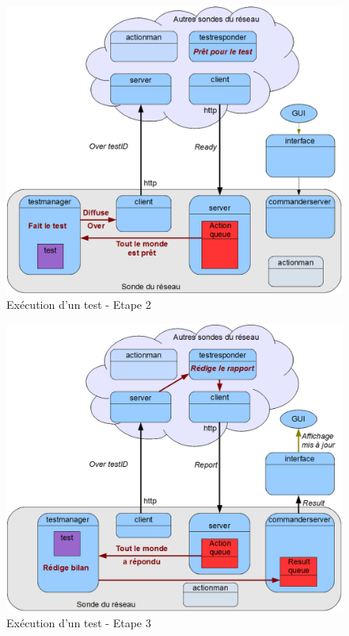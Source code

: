 \documentclass[a4paper,11pt]{article}
\begin{document}
\begin{figure}
\centering\includegraphics[width=\linewidth]{img/graphTest2.png}
\caption{Exécution d'un test - Etape 2}
\end{figure}

\begin{figure}
\centering\includegraphics[width=\linewidth]{img/graphTest3.png}
\caption{Exécution d'un test - Etape 3}
\end{figure}
\end{document}
